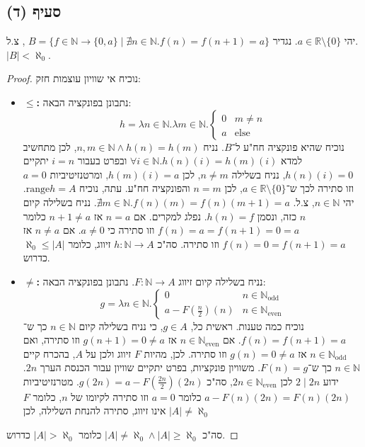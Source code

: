 \documentclass[]{article}
\newcommand\N     {\mathbb{N}}
\newcommand\R     {\mathbb{R}}
\newcommand\Neven {\N_{\mathrm{even}}}
\newcommand\Nodd  {\N_{\mathrm{odd }}}
\newcommand\other {\text{else}}
\newcommand\range {\text{range}}
\newcommand\az    {\aleph_0}
\begin{document}
	\subsection*{סעיף (ד)}
	יהי $ a \in \R \setminus \{0\} $. נגדיר 
	$ B = \{ f \in \N\to \{0, a\} \mid \nexists n \in \N. f(n) = f(n + 1) = a \} $
	, צ.ל. $ |B| < \az $.
	\begin{proof}
		נוכיח אי שוויון עוצמות חזק: 
		\begin{itemize}
			\item $ \bm{\le} $\textbf{: }נתבונן בפונקציה הבאה: 
			 \[ h = \lambda n \in \N. \lambda m \in \N. \begin{cases}
			 	0 & m \neq n \\
			 	a &\other
			 \end{cases} \]
			נוכיח שהיא פונקציה חח"ע ל־$ B $. נניח $ n, m \in \N \land h(n) = h(m) $, לכן מתחשיב למדא $ \forall i \in \N. h(n)(i) = h(m)(i) $ ובפרט בעבור $ i = n $ יתקיים $ h(n)(i) = 0 $, נניח בשלילה $ n \neq m $, לכן $ h(m)(i) = a $, ומרטנזיטיביות $ a = 0 $ וזו סתירה לכך ש־$ a \in \R \setminus \{0\} $, לכן $ n = m $ והפונקציה חח"ע. עתה, נוכיח $ \range h = A $. יהי $ n \in \N $, צ.ל. $ \nexists m \in \N. f(n)(m) = f(n)(m + 1) = a $. נניח בשלילה קיום $ n $ כזה, ונסמן $ h(n) = f $. נפלג למקרים. אם $ n = a $ אז $ n + 1 \neq a $ כלומר $ f(n) = a = f(n + 1) = 0 = a $ וזו סתירה כי $ a \neq 0 $. אם $ n \neq a $ אז $ f(n) = 0 = f(n + 1) = a $ וזו סתירה. סה"כ $ h \colon \N \to A $ זיווג, כלומר $ \az \le |A| $ כדרוש. 
			\item $ \bm{\neq} $\textbf{: }נניח בשלילה קיום זיווג $ F \colon \N \to A $. נתבונן בפונקציה הבאה: 
			\[ g = \lambda n \in \N. \begin{cases}
				0 & n \in \Nodd \\
				a - F\left(\tfrac{n}{2}\right)(n) & n \in \Neven
			\end{cases} \]
			נוכיח כמה טענות. ראשית כל, $ g \in A $, כי נניח בשלילה קיום $ n \in \N $ כך ש־$ f(n) = f(n + 1) = a $. אם $ n \in \Neven $ אז $ g(n + 1) = 0 \neq a $ וזו סתירה, ואם $ n \in \Nodd $ אז $ g(n) = 0 \neq a $ וזו סתירה. לכן, מהיות $ F $ זיווג ולכן על $ A $, בהכרח קיים $ n \in \N $ כך ש־$ F(n) = g $. משוויון פונקציות, בפרט יתקיים שוויון עבור הכנסת הערך $ 2n $. ידוע $ 2 \mid 2n $ לכן $ 2n \in \Neven $, סה"כ $ g(2n) = a - F\left(\tfrac{2n}{2}\right)(2n) $. מטרנזיטיביות $ a - F(n)(2n) = F(n)(2n) $ כלומר $ a = 0 $ וזו סתירה לקיומו של $ n $, כלומר $ F $ אינו זיווג, סתירה להנחת השלילה, לכן $ |A| \neq \az $
		\end{itemize}
	סה"כ $ |A| \neq \az \land |A| \ge \az $ כלומר $ |A| > \az $ כדרוש. 
	\end{proof}
\end{document}
